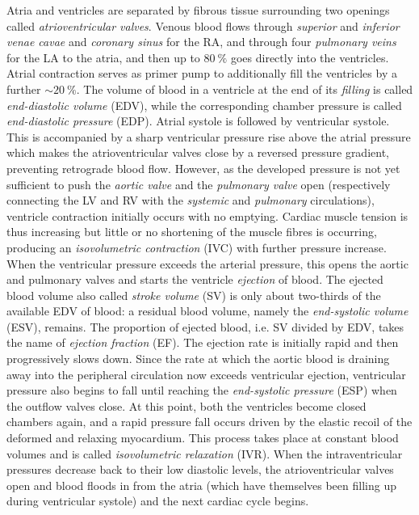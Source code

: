 \vspace{0.2cm}
Atria and ventricles are separated by fibrous tissue surrounding two openings called \textit{atrioventricular valves}. Venous blood flows through \textit{superior} and \textit{inferior} \textit{venae cavae} and \textit{coronary sinus} for the RA, and through four \textit{pulmonary veins} for the LA to the atria, and then up to $\SI{80}{\percent}$ goes directly into the ventricles. Atrial contraction serves as primer pump to additionally fill the ventricles by a further $\sim\SI{20}{\percent}$. The volume of blood in a ventricle at the end of its \textit{filling} is called \textit{end-diastolic volume} (\acs{EDV}), while the corresponding chamber pressure is called \textit{end-diastolic pressure} (\acs{EDP}). Atrial systole is followed by ventricular systole. This is accompanied by a sharp ventricular pressure rise above the atrial pressure which makes the atrioventricular valves close by a reversed pressure gradient, preventing retrograde blood flow. However, as the developed pressure is not yet sufficient to push the \textit{aortic valve} and the \textit{pulmonary valve} open (respectively connecting the LV and RV with the \textit{systemic} and \textit{pulmonary} circulations), ventricle contraction initially occurs with no emptying. Cardiac muscle tension is thus increasing but little or no shortening of the muscle fibres is occurring, producing an \textit{isovolumetric contraction} (\acs{IVC}) with further pressure increase. When the ventricular pressure exceeds the arterial pressure, this opens the aortic and pulmonary valves and starts the ventricle \textit{ejection} of blood. The ejected blood volume also called \textit{stroke volume} (\acs{SV}) is only about two-thirds of the available EDV of blood: a residual blood volume, namely the \textit{end-systolic volume} (\acs{ESV}), remains. The proportion of ejected blood, i.e. SV divided by EDV, takes the name of \textit{ejection fraction} (\acs{EF}). The ejection rate is initially rapid and then progressively slows down. Since the rate at which the aortic blood is draining away into the peripheral circulation now exceeds ventricular ejection, ventricular pressure also begins to fall until reaching the \textit{end-systolic pressure} (\acs{ESP}) when the outflow valves close. At this point, both the ventricles become closed chambers again, and a rapid pressure fall occurs driven by the elastic recoil of the deformed and relaxing myocardium. This process takes place at constant blood volumes and is called \textit{isovolumetric relaxation} (\acs{IVR}). When the intraventricular pressures decrease back to their low diastolic levels, the atrioventricular valves open and blood floods in from the atria (which have themselves been filling up during ventricular systole) and the next cardiac cycle begins.

